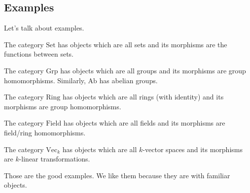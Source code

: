 \documentclass[../notes.tex]{subfiles}
\begin{document}
\subsection{Examples}
Let's talk about examples.
\begin{example}
	The category $\mathrm{Set}$ has objects which are all sets and its morphisms are the functions between sets.
\end{example}
\begin{example}
	The category $\mathrm{Grp}$ has objects which are all groups and its morphisms are group homomorphisms. Similarly, $\mathrm{Ab}$ has abelian groups.
\end{example}
\begin{example}
	The category $\mathrm{Ring}$ has objects which are all rings (with identity) and its morphisms are group homomorphisms.
\end{example}
\begin{example}
	The category $\mathrm{Field}$ has objects which are all fields and its morphisms are field/ring homomorphisms.
\end{example}
\begin{ex}
	The category $\mathrm{Vec}_k$ has objects which are all $k$-vector spaces and its morphisms are $k$-linear transformations.
\end{ex}
Those are the good examples. We like them because they are with familiar objects.
\end{document}
